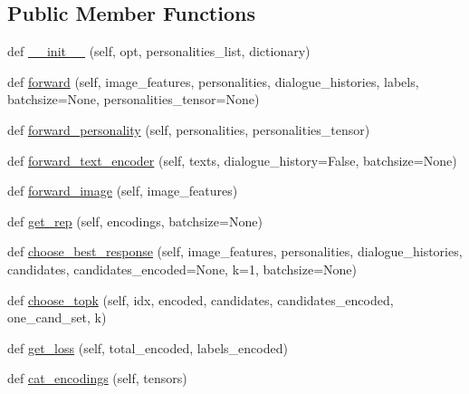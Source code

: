 \subsection*{Public Member Functions}
\begin{DoxyCompactItemize}
\item 
def \hyperlink{classtransresnet__multimodal_1_1modules_1_1TransresnetMultimodalModel_acaca0bb6a00469c4c2b74b1dfa9b8285}{\+\_\+\+\_\+init\+\_\+\+\_\+} (self, opt, personalities\+\_\+list, dictionary)
\item 
def \hyperlink{classtransresnet__multimodal_1_1modules_1_1TransresnetMultimodalModel_af21e163c4c9d044d575d3bdb02410d9e}{forward} (self, image\+\_\+features, personalities, dialogue\+\_\+histories, labels, batchsize=None, personalities\+\_\+tensor=None)
\item 
def \hyperlink{classtransresnet__multimodal_1_1modules_1_1TransresnetMultimodalModel_a50a29d40246542bad1cf6fc380d66327}{forward\+\_\+personality} (self, personalities, personalities\+\_\+tensor)
\item 
def \hyperlink{classtransresnet__multimodal_1_1modules_1_1TransresnetMultimodalModel_a0891aec01eb1a1bafb5b291296581e25}{forward\+\_\+text\+\_\+encoder} (self, texts, dialogue\+\_\+history=False, batchsize=None)
\item 
def \hyperlink{classtransresnet__multimodal_1_1modules_1_1TransresnetMultimodalModel_aec98b66974021d37e0e256be86aa16f2}{forward\+\_\+image} (self, image\+\_\+features)
\item 
def \hyperlink{classtransresnet__multimodal_1_1modules_1_1TransresnetMultimodalModel_a9c07e36d8eb4e3321a61783e7b0931bd}{get\+\_\+rep} (self, encodings, batchsize=None)
\item 
def \hyperlink{classtransresnet__multimodal_1_1modules_1_1TransresnetMultimodalModel_ad1ba23a860f8af75c97510ae52622748}{choose\+\_\+best\+\_\+response} (self, image\+\_\+features, personalities, dialogue\+\_\+histories, candidates, candidates\+\_\+encoded=None, k=1, batchsize=None)
\item 
def \hyperlink{classtransresnet__multimodal_1_1modules_1_1TransresnetMultimodalModel_a8d2154a0d338144c48e049ebe76b9727}{choose\+\_\+topk} (self, idx, encoded, candidates, candidates\+\_\+encoded, one\+\_\+cand\+\_\+set, k)
\item 
def \hyperlink{classtransresnet__multimodal_1_1modules_1_1TransresnetMultimodalModel_affb7977abac6a4671c8d31456345fb58}{get\+\_\+loss} (self, total\+\_\+encoded, labels\+\_\+encoded)
\item 
def \hyperlink{classtransresnet__multimodal_1_1modules_1_1TransresnetMultimodalModel_ae3bbb2a16a997364f8a097459a8e8562}{cat\+\_\+encodings} (self, tensors)
\end{DoxyCompactItemize}
